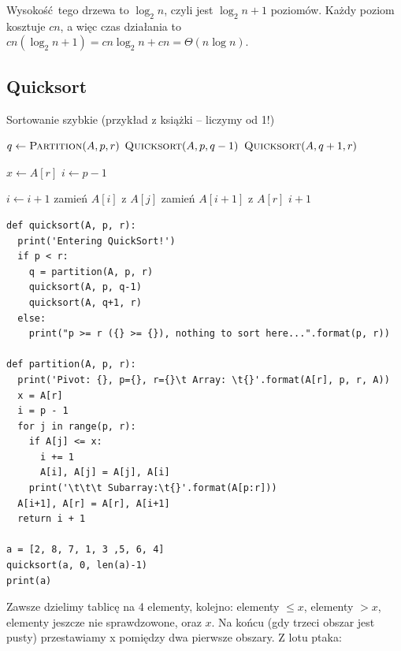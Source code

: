 \documentclass[10pt, oneside]{article}
\theoremstyle{remark}
\newcommand{\algcost}[2]{\strut\hfill\makebox[1.5cm][l]{#1}\makebox[4cm][l]{#2}}
\begin{document}
Wysokość tego drzewa to $\log_2 n$, czyli jest $\log_2 n + 1 $ poziomów.
Każdy poziom kosztuje $cn$, a więc czas działania to $cn(\log_2 n + 1) = cn \log_2 n + cn = \Theta(n \log n)$.


\subsection{Quicksort}
\begin{algorithm}
    \caption{Sortowanie szybkie (przykład z książki -- liczymy od 1!)}
    \label{alg:quicksort}
    \begin{algorithmic}[1] %
            		\State $q \gets \Call{Partition}{A, p, r}$
            		\State $\Call{Quicksort}{A, p, q-1}$
            		\State $\Call{Quicksort}{A, q+1, r}$
            	\EndIf
        \EndFunction
        
        	 \algcost{}{$\Theta(n)$}
            	\State $x \gets A[r]$
            	\State $i \gets p - 1$
            	 \algcost{$c$}{$n=r-p+1$}
	            		\State $i \gets i +1$ 
	            		\State zamień $A[i]$ z $A[j]$
	            	\EndIf
            	\EndFor
            	\State zamień $A[i+1]$ z $A[r]$
            	\State \Return $i +1$
        \EndFunction
    \end{algorithmic}
\end{algorithm}

\begin{verbatim}
def quicksort(A, p, r):
  print('Entering QuickSort!')
  if p < r:
    q = partition(A, p, r)
    quicksort(A, p, q-1)
    quicksort(A, q+1, r)
  else:
    print("p >= r ({} >= {}), nothing to sort here...".format(p, r))
    
def partition(A, p, r):
  print('Pivot: {}, p={}, r={}\t Array: \t{}'.format(A[r], p, r, A))
  x = A[r]
  i = p - 1
  for j in range(p, r):
    if A[j] <= x:
      i += 1
      A[i], A[j] = A[j], A[i]
    print('\t\t\t Subarray:\t{}'.format(A[p:r]))
  A[i+1], A[r] = A[r], A[i+1]
  return i + 1
  
a = [2, 8, 7, 1, 3 ,5, 6, 4]
quicksort(a, 0, len(a)-1)
print(a)	
\end{verbatim}

Zawsze dzielimy tablicę na 4 elementy, kolejno: elementy $\leq x$, elementy $> x$, elementy jeszcze nie sprawdzowone, oraz $x$.
Na końcu (gdy trzeci obszar jest pusty) przestawiamy x pomiędzy dwa pierwsze obszary.
Z lotu ptaka:
\end{document}
